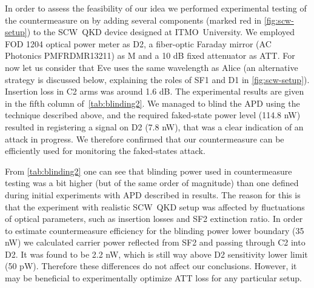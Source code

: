 In order to assess the feasibility of our idea we performed experimental testing of the countermeasure on by adding several components (marked red in \ref{fig:scw-setup}) to the SCW~QKD device designed at ITMO~University. We employed FOD 1204 optical power meter as D2, a fiber-optic Faraday mirror (AC Photonics PMFRDMR13211) as M and a 10 dB fixed attenuator as ATT. For now let us consider that Eve uses the same wavelength as Alice (an alternative strategy is discussed below, explaining the roles of SF1 and D1 in \ref{fig:scw-setup}). Insertion loss in C2 arms was around 1.6 dB. The experimental results are given in the fifth column of~\ref{tab:blinding2}. We managed to blind the APD using the technique described above, and the required faked-state power level (114.8 nW) resulted in registering a signal on D2 (7.8 nW), that was a clear indication of an attack in progress. We therefore confirmed that our countermeasure can be efficiently used for monitoring the faked-states attack.

From \ref{tab:blinding2} one can see that blinding power used in countermeasure testing was a bit higher (but of the same order of magnitude) than one defined during initial experiments with APD described in results. The reason for this is that the experiment with realistic SCW~QKD setup was affected by fluctuations of optical parameters, such as insertion losses and SF2 extinction ratio. In order to estimate countermeasure efficiency for the blinding power lower boundary (35 nW) we calculated carrier power reflected from SF2 and passing through C2 into D2. It was found to be 2.2 nW, which is still way above D2 sensitivity lower limit (50 pW). Therefore these differences do not affect our conclusions. However, it may be beneficial to experimentally optimize ATT loss for any particular setup.

